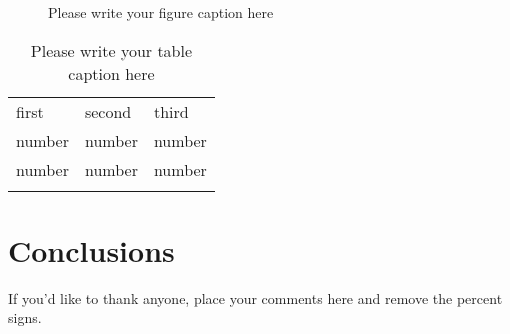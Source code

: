 \documentclass[twocolumn,draft]{svjour3}
\begin{document}
\begin{figure*}
\caption{Please write your figure caption here}
\label{fig:2}       %
\end{figure*}

\begin{table}
\caption{Please write your table caption here}
\label{tab:1}       %
\begin{tabular}{lll}
\hline\noalign{\smallskip}
first & second & third  \\
\noalign{\smallskip}\hline\noalign{\smallskip}
number & number & number \\
number & number & number \\
\noalign{\smallskip}\hline
\end{tabular}
\end{table}

\section{Conclusions}
\label{conclusions}

\begin{acknowledgements}
If you'd like to thank anyone, place your comments here
and remove the percent signs.
\end{acknowledgements}
\end{document}
